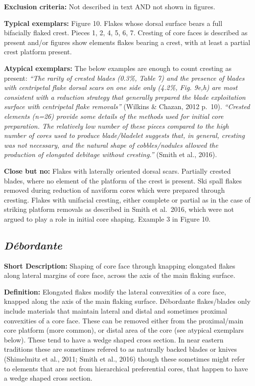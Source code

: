 \documentclass[
]{article}
\begin{document}
\textbf{Exclusion criteria:} Not described in text AND not shown in
figures.

\textbf{Typical exemplars:} Figure 10. Flakes whose dorsal surface bears
a full bifacially flaked crest. Pieces 1, 2, 4, 5, 6, 7. Cresting of
core faces is described as present and/or figures show elements flakes
bearing a crest, with at least a partial crest platform present.

\textbf{Atypical exemplars:} The below examples are enough to count
cresting as present: \emph{``The rarity of crested blades (0.3\%, Table
7) and the presence of blades with centripetal flake dorsal scars on one
side only (4.2\%, Fig. 9e,h) are most consistent with a reduction
strategy that generally prepared the blade exploitation surface with
centripetal flake removals''} (Wilkins \& Chazan, 2012 p.~10).
\emph{``Crested elements (n=26) provide some details of the methods used
for initial core preparation. The relatively low number of these pieces
compared to the high number of cores used to produce blade/bladelet
suggests that, in general, cresting was not necessary, and the natural
shape of cobbles/nodules allowed the production of elongated debitage
without cresting.''} (Smith et al., 2016).

\textbf{Close but no:} Flakes with laterally oriented dorsal scars.
Partially crested blades, where no element of the platform of the crest
is present. Ski spall flakes removed during reduction of naviform cores
which were prepared through cresting. Flakes with unifacial cresting,
either complete or partial as in the case of striking platform removals
as described in Smith et al.~2016, which were not argued to play a role
in initial core shaping. Example 3 in Figure 10.

\hypertarget{duxe9bordante}{%
\subsection{\texorpdfstring{\emph{Débordante}}{Débordante}}\label{duxe9bordante}}

\textbf{Short Description:} Shaping of core face through knapping
elongated flakes along lateral margins of core face, across the axis of
the main flaking surface.

\textbf{Definition:} Elongated flakes modify the lateral convexities of
a core face, knapped along the axis of the main flaking surface.
Débordante flakes/blades only include materials that maintain lateral
and distal and sometimes proximal convexities of a core face. These can
be removed either from the proximal/main core platform (more common), or
distal area of the core (see atypical exemplars below). These tend to
have a wedge shaped cross section. In near eastern traditions these are
sometimes refered to as naturally backed blades or knives (Shimelmitz et
al., 2011; Smith et al., 2016) though these sometimes might refer to
elements that are not from hierarchical preferential cores, that happen
to have a wedge shaped cross section.
\end{document}
